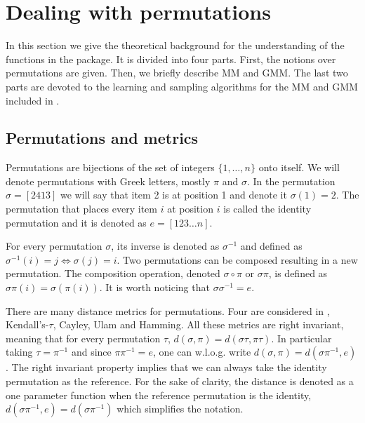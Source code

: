 \documentclass[article,nojss]{jss}
\begin{document}
\section{Dealing with permutations}%
\label{sec:permus_models}
In this section we give the theoretical background for the understanding of the functions in the  package. It is divided into four parts. First, the notions over permutations are given. Then, we briefly describe MM and GMM. The last two parts are devoted to the learning and sampling algorithms for the MM and GMM included in .

\subsection{Permutations and metrics}
\label{sec:permus}
Permutations are bijections of the set of integers $\{1, \ldots , n\}$ onto itself. We will denote permutations with Greek letters, mostly $\pi$ and $\sigma$. In the permutation $\sigma=[2413]$ we will say that item 2 is at position 1 and denote it $\sigma(1)=2$. The permutation that places every item $i$ at position $i$ is called the identity permutation and it is denoted as $e=[123\ldots n]$. 

For every permutation $\sigma$, its inverse is denoted as $\sigma^{-1}$ and defined as $\sigma^{-1}(i)=j \Leftrightarrow \sigma(j)=i$. Two permutations can be composed resulting in a new permutation. The composition operation, denoted $\sigma \circ \pi$ or $\sigma \pi$, is defined as $\sigma \pi(i) = \sigma(\pi(i))$. It is worth noticing that $\sigma \sigma^{-1} = e$.

There are many distance metrics for permutations. Four are considered in , Kendall's-$\tau$, Cayley, Ulam and Hamming. All these metrics are right invariant, meaning that for every permutation $\tau$, $d(\sigma, \pi)=d(\sigma \tau, \pi \tau)$. In particular taking $\tau=\pi^{-1}$ and since $\pi \pi^{-1}=e$, one can w.l.o.g. write $d(\sigma, \pi)=d(\sigma \pi^{-1}, e)$. The right invariant property implies that we can always take the identity permutation as the reference. For the sake of clarity, the distance is denoted as a one parameter function when the reference permutation is the identity, $d(\sigma \pi^{-1}, e) = d(\sigma \pi^{-1})$ which simplifies the notation. 
\end{document}
